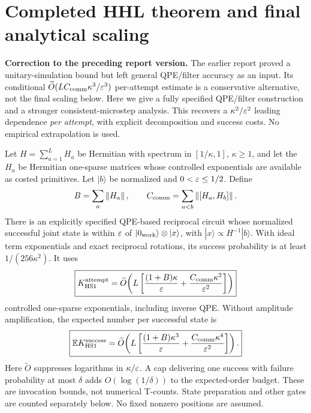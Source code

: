 \section{Completed HHL theorem and final analytical scaling}\label{sec:complete}
\textbf{Correction to the preceding report version.} The earlier report proved a unitary-simulation bound but left general QPE/filter accuracy as an input. Its conditional $\widetilde O(LC_{\mathrm{comm}}\kappa^3/\varepsilon^3)$ per-attempt estimate is a conservative alternative, not the final scaling below. Here we give a fully specified QPE/filter construction and a stronger consistent-microstep analysis. This recovers a $\kappa^2/\varepsilon^2$ leading dependence \emph{per attempt}, with explicit decomposition and success costs. No empirical extrapolation is used.

\begin{theorem}\label{thm:complete}
Let $H=\sum_{a=1}^L H_a$ be Hermitian with spectrum in $[1/\kappa,1]$, $\kappa\geq1$, and let the $H_a$ be Hermitian one-sparse matrices whose controlled exponentials are available as costed primitives. Let $|b\rangle$ be normalized and $0<\varepsilon\leq1/2$. Define
\begin{equation}
 B=\sum_a\left\lVert H_a\right\rVert,\qquad C_{\mathrm{comm}}=\sum_{a<b}\left\lVert [H_a,H_b]\right\rVert.
\end{equation}
There is an explicitly specified QPE-based reciprocal circuit whose normalized successful joint state is within $\varepsilon$ of $|0_{\rm work}\rangle\otimes|x\rangle$, with $|x\rangle\propto H^{-1}|b\rangle$. With ideal term exponentials and exact reciprocal rotations, its success probability is at least $1/(256\kappa^2)$. It uses
\begin{equation}\label{eq:final-attempt}
 \boxed{K_{\mathrm{HS1}}^{\rm attempt}=\widetilde O\!\left(
 L\left[\frac{(1+B)\kappa}{\varepsilon}+\frac{C_{\mathrm{comm}}\kappa^2}{\varepsilon^2}\right]\right)}
\end{equation}
controlled one-sparse exponentials, including inverse QPE. Without amplitude amplification, the expected number per successful state is
\begin{equation}\label{eq:final-success}
 \boxed{\mathbb EK_{\mathrm{HS1}}^{\rm success}=\widetilde O\!\left(
 L\left[\frac{(1+B)\kappa^3}{\varepsilon}+\frac{C_{\mathrm{comm}}\kappa^4}{\varepsilon^2}\right]\right).}
\end{equation}
Here $\widetilde O$ suppresses logarithms in $\kappa/\varepsilon$. A cap delivering one success with failure probability at most $\delta$ adds $O(\log(1/\delta))$ to the expected-order budget. These are invocation bounds, not numerical T-counts. State preparation and other gates are counted separately below. No fixed nonzero positions are assumed.
\end{theorem}

